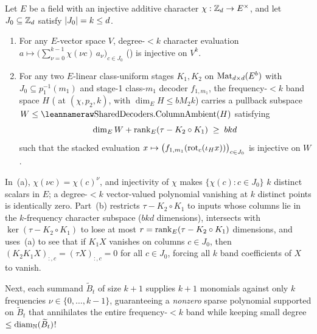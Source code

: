 \begin{lemma}\label{lem:vandermonde-subset}
\label{lem:band-pullback}
Let $E$ be a field with an injective additive character $\chi : \mathbb{Z}_d \to E^\times$, and let
$J_0 \subseteq \mathbb{Z}_d$ satisfy $\lvert J_0 \rvert = k \le d$.
\begin{enumerate}[label=(\alph*)]
\item For any $E$-vector space $V$, degree-$< k$ character evaluation
  $a \mapsto \bigl(\sum_{\nu=0}^{k-1} \chi(\nu c)\,a_\nu\bigr)_{c \in J_0}$
  () is injective on $V^k$.
\item For any two $E$-linear class-uniform stages $K_1, K_2$ on $\operatorname{Mat}_{d\times d}(E^b)$ with
  $J_0 \subseteq p_1^{-1}(m_1)$ and stage-1 class-$m_1$ decoder $f_{1,m_1}$, the frequency-$< k$
  band space $H$ ( at $(\chi, p_2, k)$, with $\dim_E H \le b M_2 k$)
  carries a pullback subspace $W \le \leanname{SharedDecoders.ColumnAmbient}(H)$ satisfying
  \[
    \dim_E W + \operatorname{rank}_E(\tau - K_2 \circ K_1) \;\ge\; b k d
  \]
  such that the stacked evaluation $x \mapsto \bigl(f_{1,m_1}(\operatorname{rot}_c(\iota_H x))\bigr)_{c \in J_0}$
  is injective on $W$.
\end{enumerate}
\end{lemma}
\begin{outline}
In~(a), $\chi(\nu c) = \chi(c)^\nu$, and injectivity of $\chi$ makes $\{\chi(c) : c \in J_0\}$
$k$ distinct scalars in $E$; a degree-$< k$ vector-valued polynomial vanishing at $k$ distinct
points is identically zero. Part~(b) restricts $\tau - K_2 \circ K_1$ to inputs whose columns lie
in the $k$-frequency character subspace ($b k d$ dimensions), intersects with
$\ker(\tau - K_2 \circ K_1)$ to lose at most $r = \operatorname{rank}_E(\tau - K_2 \circ K_1)$ dimensions, and
uses~(a) to see that if $K_1 X$ vanishes on columns $c \in J_0$, then $(K_2 K_1 X)_{:,c} =
(\tau X)_{:,c} = 0$ for all $c \in J_0$, forcing all $k$ band coefficients of $X$ to vanish.
\end{outline}

Next, each summand $\widetilde{B}_t$ of size $k + 1$ supplies $k + 1$ monomials against only $k$
frequencies $\nu \in \{0, \dots, k-1\}$, guaranteeing a \emph{nonzero} sparse polynomial supported
on $\widetilde{B}_t$ that annihilates the entire frequency-$< k$ band while keeping small degree
$\le \operatorname{diam}_{\mathbb{N}}(\widetilde{B}_t)$!

